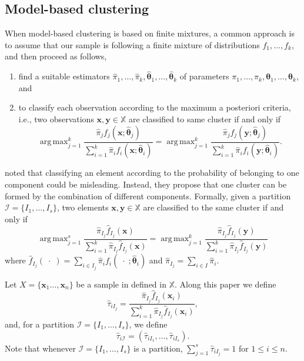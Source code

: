 \documentclass[10pt, a4paper]{article}
\DeclareMathOperator*{\argmax}{arg\,max}
\newcommand{\m}[1]{\boldsymbol{#1}}
\begin{document}
\subsection*{Model-based clustering}

When model-based clustering is based on finite mixtures, a common approach is to assume that our sample is following a finite mixture of distributions $f_1, \dots, f_k$, and then proceed as follows, 
\begin{enumerate}
\item find a suitable estimators $\hat{\pi}_1, \dots, \hat{\pi}_k, \hat{\m\theta}_1, \dots, \hat{\m\theta}_k$ of parameters $\pi_1, \dots, \pi_k, \m\theta_1, \dots, \m\theta_k$, and
\item to classify each observation according to the maximum a posteriori criteria, i.e., two observations $\m x, \m y \in \mathbb{X}$ are classified to same cluster if and only if
\[
\argmax_{j=1}^k \frac{ \hat{\pi}_j f_j(\m x ; \hat{\m\theta}_j) }{\sum_{i=1}^k \hat{\pi}_i f_i(\m x ; \hat{\m\theta}_i) } = \argmax_{j=1}^k \frac{ \hat{\pi}_j f_j(\m y ; \hat{\m\theta}_j) }{ \sum_{i=1}^k \hat{\pi}_i f_i(\m y ; \hat{\m\theta}_i) }.
\]
\end{enumerate}


\cite{lee2004combining,hennig2010methods,baudry2010combining,melnykov2013distribution,pastore2013merging} noted that classifying an element according to the probability of belonging to one component could be misleading. Instead, they propose that one cluster can be formed by the combination of different components. Formally, given a partition $\mathcal{I} = \{ I_1, \dots, I_s\}$, two elements $\m x, \m y \in \mathbb{X}$ are classified to the same cluster if and only if
\[
\argmax_{j=1}^s \frac{ \hat{\pi}_{I_j} \hat{f}_{I_j}(\m x) }{\sum_{i=1}^k \hat{\pi}_{I_j} \hat{f}_{I_j}(\m x ) } = \argmax_{j=1}^k \frac{ \hat{\pi}_{I_j} \hat{f}_{I_j}(\m y) }{ \sum_{i=1}^k \hat{\pi}_{I_j} \hat{f}_{I_j}(\m y) }
\]
where $\hat{f}_{I_j}(\; \cdot \;) = \sum_{i \in I_j} \hat{\pi}_i f_i(\; \cdot \; ; \hat{\m\theta}_i)$ and $\hat{\pi}_{I_j} =  \sum_{i \in I} \hat{\pi}_i$. 

Let $X = \{\m x_1\dots, \m x_n\}$ be a sample in defined in $\mathbb{X}$. Along this paper we define
\[
\hat{\tau}_{i I_j} =  \frac{ \hat{\pi}_{I_j} \hat{f}_{I_j}(\m x_i) }{\sum_{i=1}^k \hat{\pi}_{I_j} \hat{f}_{I_j}(\m x_i)},
\]
and, for a partition  $\mathcal{I} = \{ I_1, \dots, I_s\}$, we define
\[
\hat{\tau}_{i \mathcal{I}} = \left( \hat{\tau}_{i I_1} , \dots, \hat{\tau}_{i I_s}  \right).
\]
Note that whenever  $\mathcal{I} = \{ I_1, \dots, I_s\}$ is a partition, $\sum_{j=1}^s \hat{\tau}_{i I_j} = 1$ for $1 \leq i \leq n$.
\end{document}
